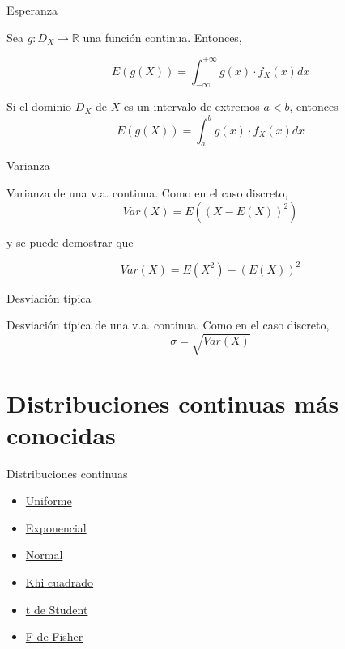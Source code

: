 \documentclass[
  ignorenonframetext,
]{beamer}
\providecommand{\tightlist}{%
  \setlength{\itemsep}{0pt}\setlength{\parskip}{0pt}}
\begin{document}
\begin{frame}{Esperanza}
\protect\hypertarget{esperanza-2}{}

Sea \(g:D_X\longrightarrow \mathbb{R}\) una función continua. Entonces,

\[E(g(X)) = \int_{-\infty}^{+\infty}g(x)\cdot f_X(x)dx\]

Si el dominio \(D_X\) de \(X\) es un intervalo de extremos \(a<b\),
entonces \[E(g(X))=\int_a^b g(x)\cdot f_X(x)dx\]

\end{frame}

\begin{frame}{Varianza}
\protect\hypertarget{varianza-2}{}

Varianza de una v.a. continua. Como en el caso discreto,
\[Var(X)=E((X-E(X))^2)\]

y se puede demostrar que

\[Var(X)=E(X^2)-(E(X))^2\]

\end{frame}

\begin{frame}{Desviación típica}
\protect\hypertarget{desviaciuxf3n-tuxedpica-1}{}

Desviación típica de una v.a. continua. Como en el caso discreto,
\[\sigma = \sqrt{Var(X)}\]

\end{frame}

\hypertarget{distribuciones-continuas-muxe1s-conocidas}{%
\section{Distribuciones continuas más
conocidas}\label{distribuciones-continuas-muxe1s-conocidas}}

\begin{frame}{Distribuciones continuas}
\protect\hypertarget{distribuciones-continuas}{}

\begin{itemize}
\tightlist
\item
  \href{https://es.wikipedia.org/wiki/Distribución_uniforme_continua}{Uniforme}
\item
  \href{https://es.wikipedia.org/wiki/Distribución_exponencial}{Exponencial}
\item
  \href{https://es.wikipedia.org/wiki/Distribución_normal}{Normal}
\item
  \href{https://es.wikipedia.org/wiki/Distribución_χ²}{Khi cuadrado}
\item
  \href{https://es.wikipedia.org/wiki/Distribución_t_de_Student}{t de
  Student}
\item
  \href{https://es.wikipedia.org/wiki/Distribución_F}{F de Fisher}
\end{itemize}

\end{frame}
\end{document}
